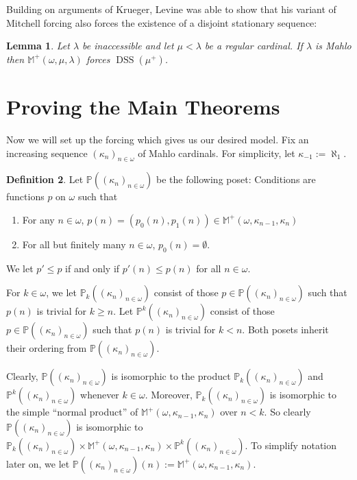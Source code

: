 \documentclass[12pt]{amsart}
\theoremstyle{definition}
\newtheorem{mydef}{Definition}[section]
\theoremstyle{remark}
\theoremstyle{plain}
\newtheorem{mylem}[mydef]{Lemma}
\numberwithin{mydef}{section}
\DeclareMathOperator{\DSS}{DSS}
\newcommand{\dM}{\mathbb{M}}
\newcommand{\dP}{\mathbb{P}}
\begin{document}
	Building on arguments of Krueger, Levine was able to show that his variant of Mitchell forcing also forces the existence of a disjoint stationary sequence:
	
	\begin{mylem}\label{MForcesDSS}
		Let $\lambda$ be inaccessible and let $\mu<\lambda$ be a regular cardinal. If $\lambda$ is Mahlo then $\dM^+(\omega,\mu,\lambda)$ forces $\DSS(\mu^+)$.
	\end{mylem}
	
	\section{Proving the Main Theorems}
	
	Now we will set up the forcing which gives us our desired model. Fix an increasing sequence $(\kappa_n)_{n\in\omega}$ of Mahlo cardinals. For simplicity, let $\kappa_{-1}:=\aleph_1$.
	
	\begin{mydef}
		Let $\dP((\kappa_n)_{n\in\omega})$ be the following poset: Conditions are functions $p$ on $\omega$ such that
		\begin{enumerate}
			\item For any $n\in\omega$, $p(n)=(p_0(n),p_1(n))\in\dM^+(\omega,\kappa_{n-1},\kappa_n)$
			\item For all but finitely many $n\in\omega$, $p_0(n)=\emptyset$.
		\end{enumerate}
		
		We let $p'\leq p$ if and only if $p'(n)\leq p(n)$ for all $n\in\omega$.
		
		For $k\in\omega$, we let $\dP_k((\kappa_n)_{n\in\omega})$ consist of those $p\in\dP((\kappa_n)_{n\in\omega})$ such that $p(n)$ is trivial for $k\geq n$. Let $\dP^k((\kappa_n)_{n\in\omega})$ consist of those $p\in\dP((\kappa_n)_{n\in\omega})$ such that $p(n)$ is trivial for $k<n$. Both posets inherit their ordering from $\dP((\kappa_n)_{n\in\omega})$.
	\end{mydef}
	
	Clearly, $\dP((\kappa_n)_{n\in\omega})$ is isomorphic to the product $\dP_k((\kappa_n)_{n\in\omega})$ and $\dP^k((\kappa_n)_{n\in\omega})$ whenever $k\in\omega$. Moreover, $\dP_k((\kappa_n)_{n\in\omega})$ is isomorphic to the simple ``normal product'' of $\dM^+(\omega,\kappa_{n-1},\kappa_n)$ over $n<k$. So clearly $\dP((\kappa_n)_{n\in\omega})$ is isomorphic to $\dP_k((\kappa_n)_{n\in\omega})\times\dM^+(\omega,\kappa_{n-1},\kappa_n)\times\dP^k((\kappa_n)_{n\in\omega})$. To simplify notation later on, we let $\dP((\kappa_n)_{n\in\omega})(n):=\dM^+(\omega,\kappa_{n-1},\kappa_n)$.
	
\end{document}
